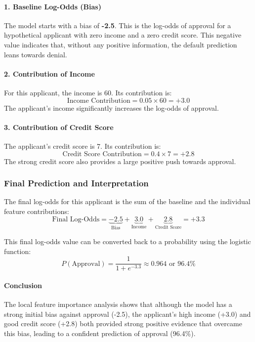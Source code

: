 \documentclass{article}
\begin{document}
\begin{multicols}{2}
\paragraph{1. Baseline Log-Odds (Bias)} The model starts with a bias of \textbf{-2.5}. This is the log-odds of approval for a hypothetical applicant with zero income and a zero credit score. This negative value indicates that, without any positive information, the default prediction leans towards denial.

\paragraph{2. Contribution of Income} For this applicant, the income is 60. Its contribution is:
$$ \text{Income Contribution} = 0.05 \times 60 = +3.0 $$
The applicant's income significantly increases the log-odds of approval.

\paragraph{3. Contribution of Credit Score} The applicant's credit score is 7. Its contribution is:
$$ \text{Credit Score Contribution} = 0.4 \times 7 = +2.8 $$
The strong credit score also provides a large positive push towards approval.

\subsubsection{Final Prediction and Interpretation}

The final log-odds for this applicant is the sum of the baseline and the individual feature contributions:
$$ \text{Final Log-Odds} = \underbrace{-2.5}_{\text{Bias}} + \underbrace{3.0}_{\text{Income}} + \underbrace{2.8}_{\text{Credit Score}} = +3.3 $$

This final log-odds value can be converted back to a probability using the logistic function:
$$ P(\text{Approval}) = \frac{1}{1 + e^{-3.3}} \approx 0.964 \text{ or } 96.4\% $$

\paragraph{Conclusion} The local feature importance analysis shows that although the model has a strong initial bias against approval (-2.5), the applicant's high income (+3.0) and good credit score (+2.8) both provided strong positive evidence that overcame this bias, leading to a confident prediction of approval (96.4\%).



\end{multicols}
\end{document}
